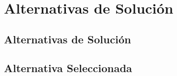 \documentclass[main.tex]{subfiles}
\begin{document}
	\chapter[Alt. Solución]{Alternativas de Solución}
	\section[Alt. Solución]{Alternativas de Solución}
	\lipsum[3-5]
	\section[Alt. Seleccionada]{Alternativa Seleccionada}
	\lipsum[7-9]
	\newpage
\end{document}
